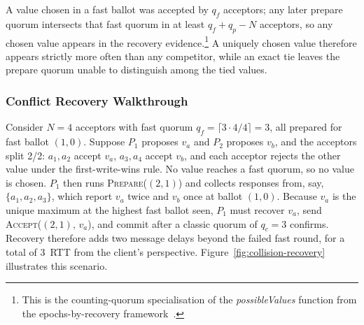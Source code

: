 \noindent A value chosen in a fast ballot was accepted by $q_f$ acceptors; any later prepare quorum intersects that fast quorum in at least $q_f + q_p - N$ acceptors, so any chosen value appears in the recovery evidence.\footnote{This is the counting-quorum specialisation of the \emph{possibleValues} function from the epochs-by-recovery framework~\cite{howard_tr19}.}
A uniquely chosen value therefore appears strictly more often than any competitor, while an exact tie leaves the prepare quorum unable to distinguish among the tied values.

\subsubsection{Conflict Recovery Walkthrough}
Consider $N = 4$ acceptors with fast quorum $q_f = \lceil 3 \cdot 4 / 4 \rceil = 3$, all prepared for fast ballot $(1, 0)$.
Suppose $P_1$ proposes $v_a$ and $P_2$ proposes $v_b$, and the acceptors split 2/2: $a_1,a_2$ accept $v_a$, $a_3,a_4$ accept $v_b$, and each acceptor rejects the other value under the first-write-wins rule.
No value reaches a fast quorum, so no value is chosen.
$P_1$ then runs \textsc{Prepare}($(2, 1)$) and collects responses from, say, $\{a_1, a_2, a_3\}$, which report $v_a$ twice and $v_b$ once at ballot $(1, 0)$.
Because $v_a$ is the unique maximum at the highest fast ballot seen, $P_1$ must recover $v_a$, send \textsc{Accept}($(2, 1),\, v_a$), and commit after a classic quorum of $q_c = 3$ confirms.
Recovery therefore adds two message delays beyond the failed fast round, for a total of 3~RTT from the client's perspective.
Figure~\ref{fig:collision-recovery} illustrates this scenario.

